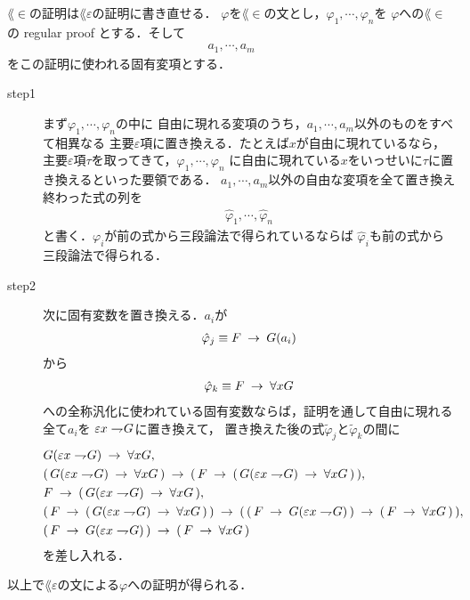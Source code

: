 	$\lang{\in}$の証明は$\lang{\varepsilon}$の証明に書き直せる．
	$\varphi$を$\lang{\in}$の文とし，$\varphi_{1},\cdots,\varphi_{n}$を
	$\varphi$への$\lang{\in}$の regular proof とする．そして
	\begin{align}
		a_{1},\cdots,a_{m}
	\end{align}
	をこの証明に使われる固有変項とする．
	\begin{description}
		\item[step1]
			まず$\varphi_{1},\cdots,\varphi_{n}$の中に
			自由に現れる変項のうち，$a_{1},\cdots,a_{m}$以外のものをすべて相異なる
			主要$\varepsilon$項に置き換える．たとえば$x$が自由に現れているなら，
			主要$\varepsilon$項$\tau$を取ってきて，$\varphi_{1},\cdots,\varphi_{n}$
			に自由に現れている$x$をいっせいに$\tau$に置き換えるといった要領である．
			$a_{1},\cdots,a_{m}$以外の自由な変項を全て置き換え終わった式の列を
			\begin{align}
				\hat{\varphi}_{1}, \cdots, \hat{\varphi}_{n}
			\end{align}
			と書く．$\varphi_{i}$が前の式から三段論法で得られているならば
			$\hat{\varphi}_{i}$も前の式から三段論法で得られる．
			
		\item[step2]
			次に固有変数を置き換える．$a_{i}$が
			\begin{align}
				\hat{\varphi}_{j} \equiv F \hspace{0.25em}\rightarrow\hspace{0.25em} G(a_{i})
			\end{align}
			から
			\begin{align}
				\hat{\varphi}_{k} \equiv F \hspace{0.25em}\rightarrow\hspace{0.25em} \forall x G
			\end{align}
			への全称汎化に使われている固有変数ならば，証明を通して自由に現れる全て$a_{i}$を
			$\varepsilon x \rightharpoondown\hspace{-0.25em} G$に置き換えて，
			置き換えた後の式$\tilde{\varphi}_{j}$と$\tilde{\varphi}_{k}$の間に
			\begin{align}
				&G(\varepsilon x \rightharpoondown\hspace{-0.25em} G) \hspace{0.25em}\rightarrow\hspace{0.25em} \forall x G, \\
				&(\, G(\varepsilon x \rightharpoondown\hspace{-0.25em} G) \hspace{0.25em}\rightarrow\hspace{0.25em} \forall x G\, )
				\hspace{0.25em}\rightarrow\hspace{0.25em} (\, F \hspace{0.25em}\rightarrow\hspace{0.25em} (\, G(\varepsilon x \rightharpoondown\hspace{-0.25em} G) \hspace{0.25em}\rightarrow\hspace{0.25em} \forall x G\, )\, ), \\
				&F \hspace{0.25em}\rightarrow\hspace{0.25em} (\, G(\varepsilon x \rightharpoondown\hspace{-0.25em} G) \hspace{0.25em}\rightarrow\hspace{0.25em} \forall x G\, ), \\
				&(\, F \hspace{0.25em}\rightarrow\hspace{0.25em} (\, G(\varepsilon x \rightharpoondown\hspace{-0.25em} G) \hspace{0.25em}\rightarrow\hspace{0.25em} \forall x G\, )\, ) \hspace{0.25em}\rightarrow\hspace{0.25em}
				(\, (\, F \hspace{0.25em}\rightarrow\hspace{0.25em} G(\varepsilon x \rightharpoondown\hspace{-0.25em} G)\, ) \hspace{0.25em}\rightarrow\hspace{0.25em}
				(\, F \hspace{0.25em}\rightarrow\hspace{0.25em} \forall x G\, )\, ), \\
				&(\, F \hspace{0.25em}\rightarrow\hspace{0.25em} G(\varepsilon x \rightharpoondown\hspace{-0.25em} G)\, ) \hspace{0.25em}\rightarrow\hspace{0.25em}
				(\, F \hspace{0.25em}\rightarrow\hspace{0.25em} \forall x G\, )
			\end{align}
			を差し入れる．
	\end{description}
	以上で$\lang{\varepsilon}$の文による$\varphi$への証明が得られる．
	
